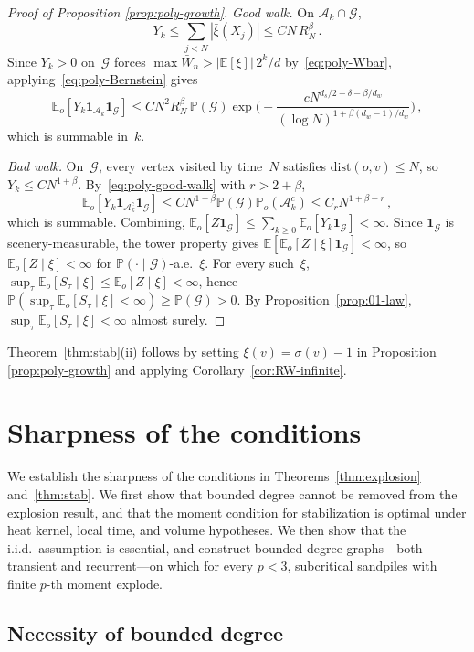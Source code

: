 \documentclass[11pt]{amsart}
\theoremstyle{plain}
\theoremstyle{definition}
\newcommand{\E}{\mathbb{E}}
\renewcommand{\P}{\mathbb{P}}
\newcommand{\one}{\mathbf{1}}
\begin{document}
\begin{proof}[Proof of Proposition \ref{prop:poly-growth}]
		\emph{Good walk.}  On $\mathcal{A}_k\cap\mathcal{G}$,
		\[
		Y_k\leq\sum_{j<N}|\bar\xi(X_j)|\leq CN\,R_N^{\beta}\,.
		\]
		Since $Y_k>0$ on~$\mathcal{G}$ forces $\max\bar W_n>|\E[\xi]|\,2^k/d$ by~\eqref{eq:poly-Wbar}, applying~\eqref{eq:poly-Bernstein} gives
		\[
		\E_o[Y_k\one_{\mathcal{A}_k}\one_\mathcal{G}]
		\leq CN^2 R_N^{\beta}\,\P(\mathcal{G})\exp\biggl(-\frac{cN^{d_s/2-\delta-\beta/d_w}}{(\log N)^{1+\beta(d_w-1)/d_w}}\biggr)\,,
		\]
		which is summable in~$k$.
		
		\emph{Bad walk.}  On~$\mathcal{G}$, every vertex visited by time~$N$ satisfies $\mathrm{dist}(o,v)\leq N$, so $Y_k\leq CN^{1+\beta}$.  By~\eqref{eq:poly-good-walk} with $r>2+\beta$,
		\[
		\E_o[Y_k\one_{\mathcal{A}_k^c}\one_\mathcal{G}]
		\leq CN^{1+\beta}\P(\mathcal{G})\P_o(\mathcal{A}_k^c)
		\leq C_r N^{1+\beta-r}\,,
		\]
		which is summable.  Combining, $\E_o[Z\one_\mathcal{G}] \leq \sum_{k\geq 0}\E_o[Y_k\one_\mathcal{G}] < \infty$. Since $\one_\mathcal{G}$ is scenery-measurable, the tower property gives $\E[\E_o[Z\mid\xi]\one_\mathcal{G}]<\infty$, so $\E_o[Z\mid\xi]<\infty$ for $\P(\cdot\mid\mathcal{G})$-a.e.~$\xi$.  For every such~$\xi$, $\sup_\tau\E_o[S_\tau\mid\xi]\leq\E_o[Z\mid\xi]<\infty$, hence $\P(\sup_\tau\E_o[S_\tau\mid\xi]<\infty)\geq\P(\mathcal{G})>0$.  By Proposition~\ref{prop:01-law}, $\sup_\tau\E_o[S_\tau\mid\xi]<\infty$ almost surely.
	\end{proof}
	
	Theorem~\ref{thm:stab}(ii) follows by setting $\xi(v)=\sigma(v)-1$ in Proposition \ref{prop:poly-growth} and applying Corollary~\ref{cor:RW-infinite}.
	
	
	
	\section{Sharpness of the conditions}\label{sec:counterexamples}
	
	We establish the sharpness of the conditions in Theorems~\ref{thm:explosion} and~\ref{thm:stab}. We first show that bounded degree cannot be removed from the explosion result, and that the moment condition for stabilization is optimal under heat kernel, local time, and volume hypotheses. We then show that the i.i.d.\ assumption is essential, and construct bounded-degree graphs---both transient and recurrent---on which for every $p<3$, subcritical sandpiles with finite $p$-th moment explode.
	
	\subsection{Necessity of bounded degree}
	
\end{document}
